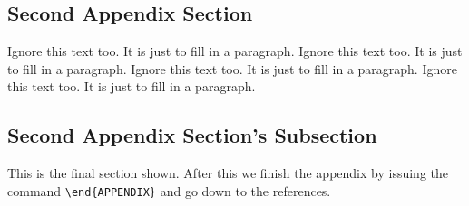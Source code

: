 \documentclass{ics-2015}
\begin{document}
\begin{APPENDIX}{}
\section{Second Appendix Section}

Ignore this text too. It is just to fill in a paragraph.
Ignore this text too. It is just to fill in a paragraph.
Ignore this text too. It is just to fill in a paragraph.
Ignore this text too. It is just to fill in a paragraph.

\subsection{Second Appendix Section's Subsection}

This is the final section shown. After this we finish the appendix
by issuing the command \verb+\end{APPENDIX}+ and go down to the references.

\end{APPENDIX}





\end{document}
